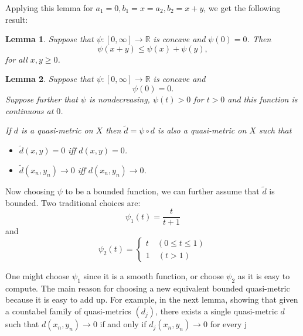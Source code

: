 \documentclass{article} %
\newtheorem{lemma}{Lemma}
\begin{document}
Applying this lemma for $a_1 =0, b_1=x = a_2, b_2=x+y$, we get the following result:
\begin{lemma}
    Suppose that $\psi \colon [0,\infty] \to \mathbb{R}$ is concave and $\psi(0)=0$. Then
    \[ \psi(x+y) \le \psi(x) + \psi(y),\]
    for all $x,y \ge 0$.
\end{lemma}
\begin{lemma}
    Suppose that $\psi \colon [0,\infty] \to \mathbb{R}$ is concave and
    \[\psi(0)=0.\]
    Suppose further that $\psi$ is nondecreasing, $\psi(t) >0$ for $t >0$ and this function is continuous at $0$.

    If $d$ is a quasi-metric on $X$ then $\tilde{d} = \psi \circ d$ is also a quasi-metric on $X$
    such that
    \begin{itemize}
        \item $\tilde{d}(x,y)=0$ iff $d(x,y)=0$.
        \item $\tilde{d}(x_n,y_n) \to 0$ iff $d(x_n,y_n) \to 0$.
    \end{itemize}
\end{lemma}
Now choosing $\psi$ to be a bounded function, we can further assume that $\tilde{d}$ is bounded. Two traditional choices are:
\[ \psi_1(t)= \dfrac{t}{t+1}\]
and
\[\psi_2(t) = \begin{cases}
        t \quad (0 \le t \le 1) \\
        1 \quad (t >1)
    \end{cases}\]

One might choose $\psi_1$ since it is a smooth function, or choose $\psi_2$ as it is easy to compute.
The main reason for choosing a new equivalent bounded quasi-metric because it is easy to add up. 
For example, in the next lemma, showing that given a countabel family of quasi-metrics $(d_j)$, there exists a single quasi-metric $d$
such that $d(x_n,y_n) \to 0$  if and only if $d_j(x_n,y_n) \to 0$ for every j
\end{document}
